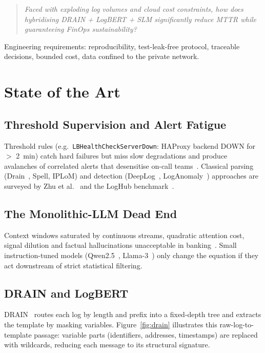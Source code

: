 \documentclass[12pt,a4paper]{report}
\begin{document}
\begin{quote}
\emph{Faced with exploding log volumes and cloud cost constraints, how does hybridising DRAIN + LogBERT + SLM significantly reduce MTTR while guaranteeing FinOps sustainability?}
\end{quote}

Engineering requirements: reproducibility, test-leak-free protocol, traceable decisions, bounded cost, data confined to the private network.

\section{State of the Art}

\subsection{Threshold Supervision and Alert Fatigue}

Threshold rules (e.g.\ \texttt{LBHealthCheckServerDown}: HAProxy backend DOWN for $>$ 2~min) catch hard failures but miss slow degradations and produce avalanches of correlated alerts that desensitise on-call teams~\cite{ndichu2026}. Classical parsing (Drain~\cite{he2017drain}, Spell, IPLoM) and detection (DeepLog~\cite{du2017deeplog}, LogAnomaly~\cite{meng2019loganomaly}) approaches are surveyed by Zhu et al.~\cite{zhu2019tools} and the LogHub benchmark~\cite{he2020loghub}.

\subsection{The Monolithic-LLM Dead End}

Context windows saturated by continuous streams, quadratic attention cost, signal dilution and factual hallucinations unacceptable in banking~\cite{ji2023hallucination}. Small instruction-tuned models (Qwen2.5~\cite{qwen2025}, Llama-3~\cite{llama3}) only change the equation if they act downstream of strict statistical filtering.

\subsection{DRAIN and LogBERT}

DRAIN~\cite{he2017drain} routes each log by length and prefix into a fixed-depth tree and extracts the template by masking variables. Figure~\ref{fig:drain} illustrates this raw-log-to-template passage: variable parts (identifiers, addresses, timestamps) are replaced with wildcards, reducing each message to its structural signature.
\end{document}
